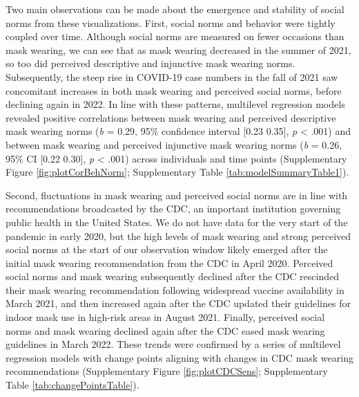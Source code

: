 \documentclass[
  man, donotrepeattitle,mask,floatsintext]{apa6}
\begin{document}
Two main observations can be made about the emergence and stability of social norms from these visualizations. First, social norms and behavior were tightly coupled over time. Although social norms are measured on fewer occasions than mask wearing, we can see that as mask wearing decreased in the summer of 2021, so too did perceived descriptive and injunctive mask wearing norms. Subsequently, the steep rise in COVID-19 case numbers in the fall of 2021 saw concomitant increases in both mask wearing and perceived social norms, before declining again in 2022. In line with these patterns, multilevel regression models revealed positive correlations between mask wearing and perceived descriptive mask wearing norms (\emph{b} = 0.29, 95\% confidence interval {[}0.23 0.35{]}, \emph{p} \textless{} .001) and between mask wearing and perceived injunctive mask wearing norms (\emph{b} = 0.26, 95\% CI {[}0.22 0.30{]}, \emph{p} \textless{} .001) across individuals and time points (Supplementary Figure \ref{fig:plotCorBehNorm}; Supplementary Table \ref{tab:modelSummaryTable1}).

Second, fluctuations in mask wearing and perceived social norms are in line with recommendations broadcasted by the CDC, an important institution governing public health in the United States. We do not have data for the very start of the pandemic in early 2020, but the high levels of mask wearing and strong perceived social norms at the start of our observation window likely emerged after the initial mask wearing recommendation from the CDC in April 2020. Perceived social norms and mask wearing subsequently declined after the CDC rescinded their mask wearing recommendation following widespread vaccine availability in March 2021, and then increased again after the CDC updated their guidelines for indoor mask use in high-risk areas in August 2021. Finally, perceived social norms and mask wearing declined again after the CDC eased mask wearing guidelines in March 2022. These trends were confirmed by a series of multilevel regression models with change points aligning with changes in CDC mask wearing recommendations (Supplementary Figure \ref{fig:plotCDCSens}; Supplementary Table \ref{tab:changePointsTable}).
\end{document}
